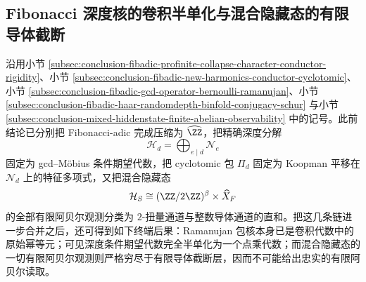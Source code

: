 \subsection{Fibonacci 深度核的卷积半单化与混合隐藏态的有限导体截断}\label{subsec:conclusion-fibadic-kernel-semisimplicity-hiddenstate-truncation}
沿用小节 \ref{subsec:conclusion-fibadic-profinite-collapse-character-conductor-rigidity}、小节 \ref{subsec:conclusion-fibadic-new-harmonics-conductor-cyclotomic}、小节 \ref{subsec:conclusion-fibadic-gcd-operator-bernoulli-ramanujan}、小节 \ref{subsec:conclusion-fibadic-haar-randomdepth-binfold-conjugacy-schur} 与小节 \ref{subsec:conclusion-mixed-hiddenstate-finite-abelian-observability} 中的记号。此前结论已分别把 Fibonacci-adic 完成压缩为 \(\widehat{\ZZ}\)，把精确深度分解
\[
\mathcal H_d=\bigoplus_{e\mid d}\mathcal N_e
\]
固定为 gcd--Möbius 条件期望代数，把 cyclotomic 包 \(\Pi_d\) 固定为 Koopman 平移在 \(\mathcal N_d\) 上的特征多项式，又把混合隐藏态
\[
\mathcal H_S\cong (\ZZ/2\ZZ)^\beta\times \widehat X_F
\]
的全部有限阿贝尔观测分类为 \(2\)-扭量通道与整数导体通道的直和。把这几条链进一步合并之后，还可得到如下终端后果：Ramanujan 包核本身已是卷积代数中的原始幂等元；可见深度条件期望代数完全半单化为一个点乘代数；而混合隐藏态的一切有限阿贝尔观测则严格穷尽于有限导体截断层，因而不可能给出忠实的有限阿贝尔读取。

